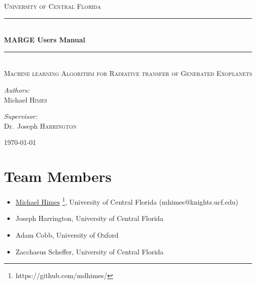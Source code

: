 \documentclass[letterpaper, 12pt]{article}
\begin{document}
\begin{titlepage}
\begin{center}

\textsc{\LARGE University of Central Florida}\\[1.5cm]

\rule{\linewidth}{0.5mm} \\[0.4cm]
{ \huge \bfseries MARGE Users Manual \\[0.4cm] }
\rule{\linewidth}{0.5mm} \\[1.0cm]

\textsc{\Large Machine learning Algorithm for Radiative transfer of Generated Exoplanets}\\[1.5cm]

\noindent
\begin{minipage}{0.4\textwidth}
\begin{flushleft}
\large
\emph{Authors:} \\
Michael \textsc{Himes} \\
\end{flushleft}
\end{minipage}%
\begin{minipage}{0.4\textwidth}
\begin{flushright} \large
\emph{Supervisor:} \\
Dr.~Joseph \textsc{Harrington}
\end{flushright}
\end{minipage}
\vfill

{\large \today}

\end{center}
\end{titlepage}

\tableofcontents
\newpage

\section{Team Members}
\label{sec:team}

\begin{itemize}
\item \href{https://github.com/mdhimes/}{Michael Himes}%
  \footnote{https://github.com/mdhimes/}, University of
  Central Florida (mhimes@knights.ucf.edu)
\item Joseph Harrington, University of Central Florida
\item Adam Cobb, University of Oxford
\item Zacchaeus Scheffer, University of Central Florida
\end{itemize}
\end{document}
